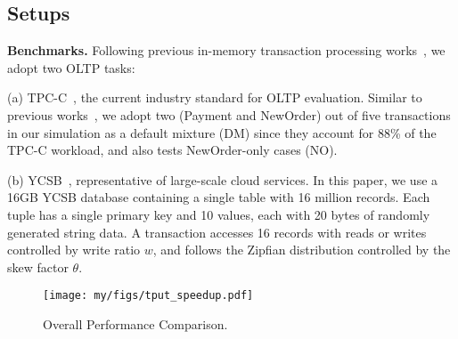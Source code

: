 \subsection{Setups}  \label{subsec:setup}

\noindent \textbf{Benchmarks.} 
Following previous in-memory transaction processing works~\cite{dbx1000_dist_vldb17, drtm, drtmh, polyjuice_osdi21}, we adopt two OLTP tasks: 

\noindent (a) TPC-C~\cite{tpc-c}, the current industry standard for OLTP evaluation. 
Similar to previous works~\cite{dbx1000_dist_vldb17}, we adopt two (Payment and NewOrder) out of five transactions in our simulation as a default mixture (DM) since they account for 88\% of the TPC-C workload, and also tests NewOrder-only cases (NO). 

\noindent (b) YCSB~\cite{ycsb}, representative of large-scale cloud services. In this paper, we use a 16GB YCSB database containing a single table with 16 million records. Each tuple has a single primary key and 10 values, each with 20 bytes of randomly generated string data. 
A transaction accesses 16 records with reads or writes controlled by write ratio $w$, and follows the Zipfian distribution controlled by the skew factor $\theta$.





\begin{figure*}[t]
  \centering
  \texttt{[image: my/figs/tput\_speedup.pdf]}
  \caption{Overall Performance Comparison. }
  \label{fig:throughput}
\end{figure*}

